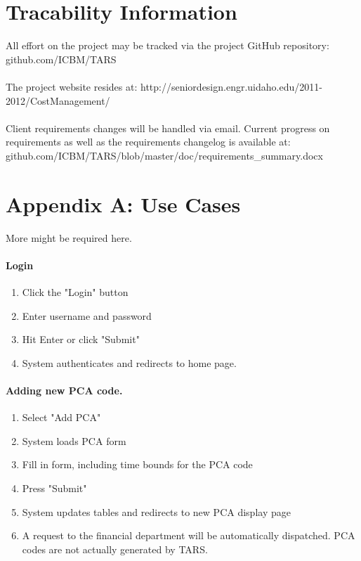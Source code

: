 \documentclass[letterpaper]{article}
\begin{document}
\section{Tracability Information}
All effort on the project may be tracked via the project GitHub repository: github.com/ICBM/TARS\\
\\
The project website resides at: http://seniordesign.engr.uidaho.edu/2011-2012/CostManagement/\\
\\ 
Client requirements changes will be handled via email. Current progress on requirements as well as the requirements changelog is available at: github.com/ICBM/TARS/blob/master/doc/requirements\_summary.docx\\
\section{Appendix A: Use Cases} 
More might be required here.

\paragraph{Login}
\begin{enumerate}
\item Click the "Login" button
\item Enter username and password
\item Hit Enter or click "Submit"
\item System authenticates and redirects to home page.
\end{enumerate}

\paragraph{Adding new PCA code.}
\begin{enumerate}
\item Select "Add PCA"
\item System loads PCA form
\item Fill in form, including time bounds for the PCA code
\item Press "Submit"
\item System updates tables and redirects to new PCA display page
\item A request to the financial department will be automatically dispatched. PCA codes are not actually generated by TARS.
\end{enumerate}
\end{document}

